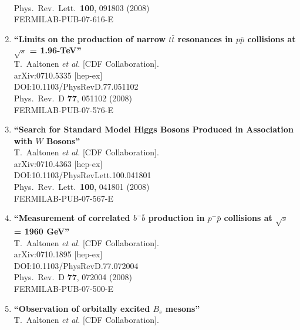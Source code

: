 \documentclass{article}
\begin{document}
\begin{enumerate}
  \\{}Phys.\ Rev.\ Lett.\  {\bf 100}, 091803 (2008)
  \\{}FERMILAB-PUB-07-616-E
\item%
{\bf ``Limits on the production of narrow $t \bar{t}$ resonances in $p \bar{p}$ collisions at $\sqrt{s}$ = 1.96-TeV''}
  \\{}T.~Aaltonen {\it et al.} [CDF Collaboration].
  \\{}arXiv:0710.5335 [hep-ex]
  \\{}DOI:10.1103/PhysRevD.77.051102
  \\{}Phys.\ Rev.\ D {\bf 77}, 051102 (2008)
  \\{}FERMILAB-PUB-07-576-E
\item%
{\bf ``Search for Standard Model Higgs Bosons Produced in Association with $W$ Bosons''}
  \\{}T.~Aaltonen {\it et al.} [CDF Collaboration].
  \\{}arXiv:0710.4363 [hep-ex]
  \\{}DOI:10.1103/PhysRevLett.100.041801
  \\{}Phys.\ Rev.\ Lett.\  {\bf 100}, 041801 (2008)
  \\{}FERMILAB-PUB-07-567-E
\item%
{\bf ``Measurement of correlated $b^- \bar{b}$ production in $p^- \bar{p}$ collisions at $\sqrt{s}$ = 1960 GeV''}
  \\{}T.~Aaltonen {\it et al.} [CDF Collaboration].
  \\{}arXiv:0710.1895 [hep-ex]
  \\{}DOI:10.1103/PhysRevD.77.072004
  \\{}Phys.\ Rev.\ D {\bf 77}, 072004 (2008)
  \\{}FERMILAB-PUB-07-500-E
\item%
{\bf ``Observation of orbitally excited $B_s$ mesons''}
  \\{}T.~Aaltonen {\it et al.} [CDF Collaboration].

\end{enumerate}
\end{document}
